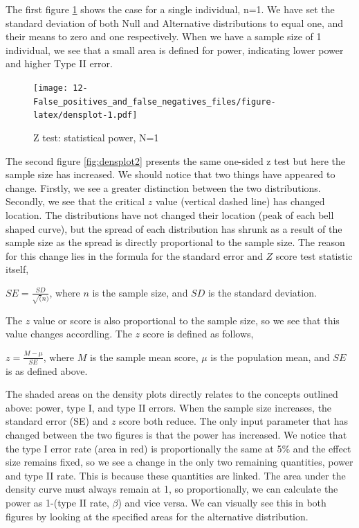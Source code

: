 \documentclass[]{book}
\begin{document}
The first figure \ref{fig:densplot} shows the case for a single individual, n=1. We have set the standard deviation of both Null and Alternative distributions to equal one, and their means to zero and one respectively. When we have a sample size of 1 individual, we see that a small area is defined for power, indicating lower power and higher Type II error.

\begin{figure}
\centering
\texttt{[image: 12-False\_positives\_and\_false\_negatives\_files/figure-latex/densplot-1.pdf]}
\caption{\label{fig:densplot}Z test: statistical power, N=1}
\end{figure}

The second figure \ref{fig:densplot2} presents the same one-sided z test but here the sample size has increased. We should notice that two things have appeared to change. Firstly, we see a greater distinction between the two distributions. Secondly, we see that the critical \(z\) value (vertical dashed line) has changed location. The distributions have not changed their location (peak of each bell shaped curve), but the spread of each distribution has shrunk as a result of the sample size as the spread is directly proportional to the sample size. The reason for this change lies in the formula for the standard error and \(Z\) score test statistic itself,

\(SE = \frac{SD}{\sqrt(n)}\), where \(n\) is the sample size, and \(SD\) is the standard deviation.

The \(z\) value or score is also proportional to the sample size, so we see that this value changes accordling. The \(z\) score is defined as follows,

\(z =\frac{M-\mu}{SE}\), where \(M\) is the sample mean score, \(\mu\) is the population mean, and \(SE\) is as defined above.

The shaded areas on the density plots directly relates to the concepts outlined above: power, type I, and type II errors. When the sample size increases, the standard error (SE) and \(z\) score both reduce. The only input parameter that has changed between the two figures is that the power has increased. We notice that the type I error rate (area in red) is proportionally the same at 5\% and the effect size remains fixed, so we see a change in the only two remaining quantities, power and type II rate. This is because these quantities are linked. The area under the density curve must always remain at 1, so proportionally, we can calculate the power as 1-(type II rate, \(\beta\)) and vice versa. We can visually see this in both figures by looking at the specified areas for the alternative distribution.
\end{document}
